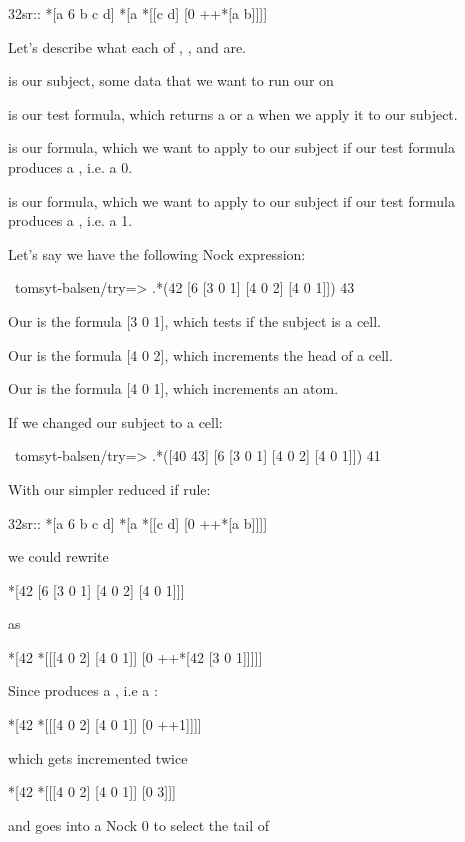 \begin{code}
32sr::   *[a 6 b c d]     *[a *[[c d] [0 ++*[a b]]]]
\end{code}
Let's describe what each of , ,  and  are.

 is our subject, some data that we want to run our  on

 is our test formula, which returns a  or a  when we apply it to our subject. 

 is our  formula, which we want to apply to our subject if our test formula produces a , i.e. a 0.

 is our  formula, which we want to apply to our subject if our test formula produces a , i.e. a 1.

Let's say we have the following Nock expression:

\begin{code}
~tomsyt-balsen/try=> .*(42 [6 [3 0 1] [4 0 2] [4 0 1]])
43
\end{code}
Our  is the formula [3 0 1], which tests if the subject is a cell.

Our  is the formula [4 0 2], which increments the head of a cell.

Our  is the formula [4 0 1], which increments an atom.

If we changed our subject to a cell:

\begin{code}
~tomsyt-balsen/try=> .*([40 43] [6 [3 0 1] [4 0 2] [4 0 1]])
41
\end{code}
With our simpler reduced if rule:

\begin{code}
32sr::   *[a 6 b c d]     *[a *[[c d] [0 ++*[a b]]]]
\end{code}
we could rewrite 

\begin{code}
*[42 [6 [3 0 1] [4 0 2] [4 0 1]]]
\end{code}
as 

\begin{code}
*[42  *[[[4 0 2] [4 0 1]] [0 ++*[42 [3 0 1]]]]]
\end{code}
Since \kode{*[42 [3 0 1]]} produces a , i.e a :

\begin{code}
*[42  *[[[4 0 2] [4 0 1]] [0 ++1]]]]
\end{code}
which gets incremented twice
\begin{code}
*[42  *[[[4 0 2] [4 0 1]] [0 3]]]
\end{code}
and goes into a Nock 0 to select the tail of \kode{[[4 0 2] [4 0 1]]}

